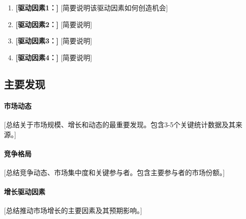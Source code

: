 \documentclass[11pt,letterpaper]{report}
\begin{document}
\begin{keyinsightbox}[关键投资驱动因素]
\begin{enumerate}
    \item \textbf{[驱动因素1：]} [简要说明该驱动因素如何创造机会]
    \item \textbf{[驱动因素2：]} [简要说明]
    \item \textbf{[驱动因素3：]} [简要说明]
    \item \textbf{[驱动因素4：]} [简要说明]
\end{enumerate}
\end{keyinsightbox}

\subsection{主要发现}

\paragraph{市场动态}
[总结关于市场规模、增长和动态的最重要发现。包含3-5个关键统计数据及其来源。]

\paragraph{竞争格局}
[总结竞争动态、市场集中度和关键参与者。包含主要参与者的市场份额。]

\paragraph{增长驱动因素}
[总结推动市场增长的主要因素及其预期影响。]
\end{document}
